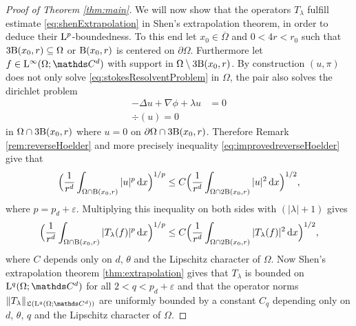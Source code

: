 \begin{proof}[Proof of Theorem \ref{thm:main}]
  We will now show that the operators $T_\lambda$ fulfill estimate \eqref{eq:shenExtrapolation} in Shen's extrapolation theorem, in order to deduce their $\mathrm{L}^p$-boundedness.
  To this end let $x_0 \in \overline \Omega$ and $0 < 4r < r_0$ such that $3 \mathrm{B}(x_0, r) \subseteq \Omega$ or $\mathrm{B}(x_0, r)$ is centered on $\partial\Omega$.
  Furthermore let $f \in \Ell^\infty(\Omega; \C^d)$ with support in $\Omega \setminus 3 \mathrm{B}(x_0, r)$.
  By construction $(u,\pi)$ does not only solve \eqref{eq:stokesResolventProblem} in $\Omega$, the pair also solves the dirichlet problem
  \begin{align*}
    -\Delta u + \nabla \phi + \lambda u &= 0 \\
    \div(u) = 0
  \end{align*}
  in $\Omega \cap 3 \mathrm{B}(x_0, r)$ where $u = 0$ on $\partial\Omega \cap 3 \mathrm{B}(x_0, r)$.
  Therefore Remark \ref{rem:reverseHoelder} and more precisely inequality \eqref{eq:improvedreverseHoelder} give that
  \begin{align*}
    \Big( \frac{1}{r^d} \int_{\Omega \cap \mathrm{B}(x_0, r)} |u|^p \, {\operatorname{d}\!{x}} \Big)^{1/p} \leq C \Big( \frac{1}{r^d} \int_{\Omega \cap 2 \mathrm{B}(x_0, r)} |u|^2 \, {\operatorname{d}\!{x}} \Big)^{1/2},
  \end{align*}
  where $p = p_d + \varepsilon$.
  Multiplying this inequality on both sides with $(|\lambda| + 1)$ gives
  \begin{align}
    \label{eq:tlambdaEstimate}
    \Big( \frac{1}{r^d} \int_{\Omega \cap \mathrm{B}(x_0, r)} |T_\lambda(f)|^p \, {\operatorname{d}\!{x}} \Big)^{1/p} \leq C \Big( \frac{1}{r^d} \int_{\Omega \cap 2 \mathrm{B}(x_0, r)} |T_\lambda(f)|^2 \, {\operatorname{d}\!{x}} \Big)^{1/2},
  \end{align}
  where $C$ depends only on $d$, $\theta$ and the Lipschitz character of $\Omega$.
  Now Shen's extrapolation theorem \ref{thm:extrapolation} gives that $T_\lambda$ is bounded on $\Ell^q(\Omega; \C^d)$ for all $2 < q < p_d + \varepsilon$ and that the operator norms $\|T_\lambda\|_{\Li(\Ell^q(\Omega; \C^d))}$ are uniformly bounded by a constant $C_q$ depending only on $d$, $\theta$, $q$ and the Lipschitz character of $\Omega$.


\end{proof}

